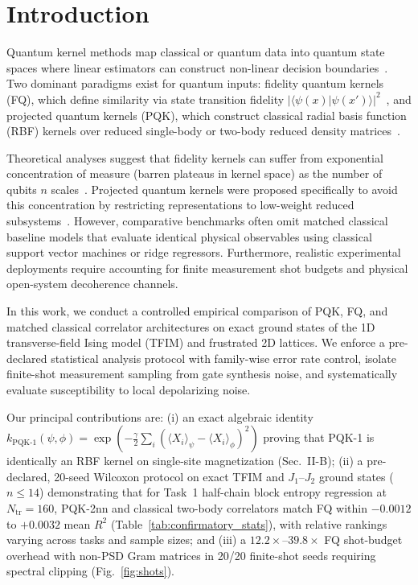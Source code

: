 \documentclass[conference]{IEEEtran}
\begin{document}
\section{Introduction}
Quantum kernel methods map classical or quantum data into quantum state spaces where linear estimators can construct non-linear decision boundaries~\cite{havlicek2019, schuld2019}. Two dominant paradigms exist for quantum inputs: fidelity quantum kernels (FQ), which define similarity via state transition fidelity $|\langle \psi(x) | \psi(x') \rangle|^2$~\cite{havlicek2019}, and projected quantum kernels (PQK), which construct classical radial basis function (RBF) kernels over reduced single-body or two-body reduced density matrices~\cite{huang2021}.

Theoretical analyses suggest that fidelity kernels can suffer from exponential concentration of measure (barren plateaus in kernel space) as the number of qubits $n$ scales~\cite{thanasilp2024, shaydulin2022}. Projected quantum kernels were proposed specifically to avoid this concentration by restricting representations to low-weight reduced subsystems~\cite{huang2021}. However, comparative benchmarks often omit matched classical baseline models that evaluate identical physical observables using classical support vector machines or ridge regressors. Furthermore, realistic experimental deployments require accounting for finite measurement shot budgets and physical open-system decoherence channels.

In this work, we conduct a controlled empirical comparison of PQK, FQ, and matched classical correlator architectures on exact ground states of the 1D transverse-field Ising model (TFIM) and frustrated 2D lattices. We enforce a pre-declared statistical analysis protocol with family-wise error rate control, isolate finite-shot measurement sampling from gate synthesis noise, and systematically evaluate susceptibility to local depolarizing noise.

Our principal contributions are: (i) an exact algebraic identity
$k_{\mathrm{PQK\text{-}1}}(\psi,\phi)=\exp(-\tfrac{\gamma}{2}\sum_i
(\langle X_i\rangle_\psi-\langle X_i\rangle_\phi)^2)$ proving that PQK-1
is identically an RBF kernel on single-site magnetization (Sec.~II-B);
(ii) a pre-declared, 20-seed Wilcoxon protocol on exact TFIM and
$J_1$--$J_2$ ground states ($n\le 14$) demonstrating that for Task~1
half-chain block entropy regression at $N_{\mathrm{tr}}=160$, PQK-2nn
and classical two-body correlators match FQ within $-0.0012$ to $+0.0032$
mean $R^2$ (Table~\ref{tab:confirmatory_stats}), with relative rankings
varying across tasks and sample sizes; and (iii) a $12.2\times$--$39.8\times$ FQ
shot-budget overhead with non-PSD Gram matrices in 20/20 finite-shot
seeds requiring spectral clipping (Fig.~\ref{fig:shots}).
\end{document}
